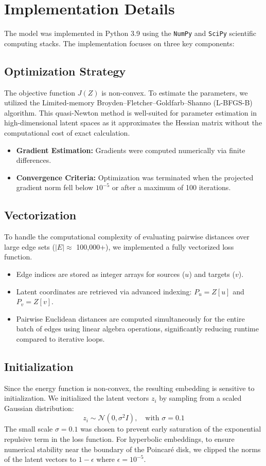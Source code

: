 \section{Implementation Details}

The model was implemented in Python 3.9 using the \texttt{NumPy} and \texttt{SciPy} scientific computing stacks. The implementation focuses on three key components:

\subsection{Optimization Strategy}
The objective function $J(Z)$ is non-convex. To estimate the parameters, we utilized the Limited-memory Broyden–Fletcher–Goldfarb–Shanno (L-BFGS-B) algorithm. This quasi-Newton method is well-suited for parameter estimation in high-dimensional latent spaces as it approximates the Hessian matrix without the computational cost of exact calculation.
\begin{itemize}
    \item \textbf{Gradient Estimation:} Gradients were computed numerically via finite differences.
    \item \textbf{Convergence Criteria:} Optimization was terminated when the projected gradient norm fell below $10^{-5}$ or after a maximum of 100 iterations.
\end{itemize}

\subsection{Vectorization}
To handle the computational complexity of evaluating pairwise distances over large edge sets ($|E| \approx$ 100,000+), we implemented a fully vectorized loss function.
\begin{itemize}
    \item Edge indices are stored as integer arrays for sources ($u$) and targets ($v$).
    \item Latent coordinates are retrieved via advanced indexing: $P_u = Z[u]$ and $P_v = Z[v]$.
    \item Pairwise Euclidean distances are computed simultaneously for the entire batch of edges using linear algebra operations, significantly reducing runtime compared to iterative loops.
\end{itemize}

\subsection{Initialization}
Since the energy function is non-convex, the resulting embedding is sensitive to initialization. We initialized the latent vectors $z_i$ by sampling from a scaled Gaussian distribution:
\begin{equation}
    z_i \sim \mathcal{N}(0, \sigma^2 I), \quad \text{with } \sigma = 0.1
\end{equation}
The small scale $\sigma=0.1$ was chosen to prevent early saturation of the exponential repulsive term in the loss function. For hyperbolic embeddings, to ensure numerical stability near the boundary of the Poincaré disk, we clipped the norms of the latent vectors to $1 - \epsilon$ where $\epsilon = 10^{-5}$.

